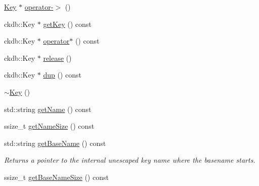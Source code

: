 \begin{DoxyCompactItemize}
\hyperlink{classkdb_1_1Key}{Key} $\ast$ \hyperlink{classkdb_1_1Key_ab64ec9d578e083dad3e43322535cf108}{operator-\/$>$} ()
\item 
ckdb\-::\-Key $\ast$ \hyperlink{classkdb_1_1Key_ae81381365a7c159f070e74a7b7bd8688}{get\-Key} () const 
\item 
ckdb\-::\-Key $\ast$ \hyperlink{classkdb_1_1Key_a6e0dd36c31cc7c46ee1cda0decc6e884}{operator$\ast$} () const 
\begin{DoxyCompactList}\small\item\em \end{DoxyCompactList}\item 
ckdb\-::\-Key $\ast$ \hyperlink{classkdb_1_1Key_a9ae719043e6e99f5f3d6fb85837306f8}{release} ()
\item 
ckdb\-::\-Key $\ast$ \hyperlink{classkdb_1_1Key_a43a1f28d7a0d40f0ded8473d480931ff}{dup} () const 
\begin{DoxyCompactList}\small\item\em \end{DoxyCompactList}\item 
\hyperlink{classkdb_1_1Key_a35dd6ae58d125a298e30aed13b15c1f4}{$\sim$\-Key} ()
\begin{DoxyCompactList}\small\item\em \end{DoxyCompactList}\item 
std\-::string \hyperlink{classkdb_1_1Key_aa3903afe9a4b7aebf427a74612a803cd}{get\-Name} () const 
\begin{DoxyCompactList}\small\item\em \end{DoxyCompactList}\item 
ssize\-\_\-t \hyperlink{classkdb_1_1Key_aee1d42f22eda4d84d78ab72cd60cc005}{get\-Name\-Size} () const 
\begin{DoxyCompactList}\small\item\em \end{DoxyCompactList}\item 
std\-::string \hyperlink{classkdb_1_1Key_a43d3efd13e01624c520346a19984750b}{get\-Base\-Name} () const 
\begin{DoxyCompactList}\small\item\em Returns a pointer to the internal unescaped key name where the {\ttfamily basename} starts.  \end{DoxyCompactList}\item 
ssize\-\_\-t \hyperlink{classkdb_1_1Key_a92fde543f3fbfaa0f8af80dad12a9fe7}{get\-Base\-Name\-Size} () const 

\end{DoxyCompactItemize}
